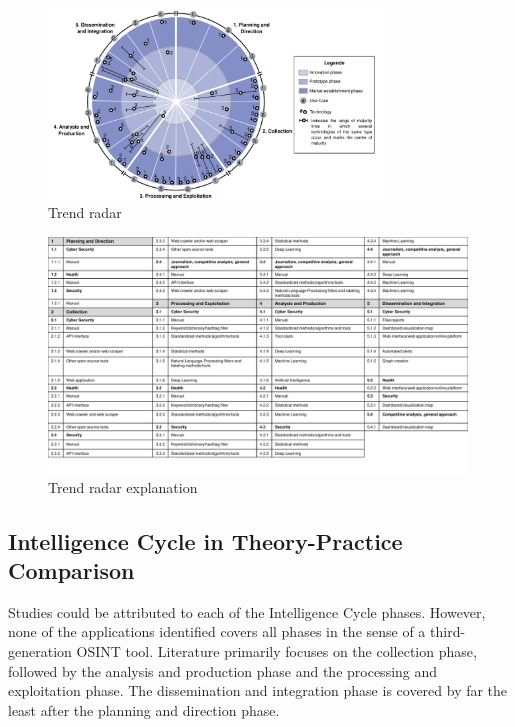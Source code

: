 \documentclass[10pt]{article}
\begin{document}
\begin{figure}[thb]
    \centering
    \includegraphics[width=0.8\textwidth]{PDF/images/crop_Trendradar}
    \caption{Trend radar}
    \label{fig:trendradar}
\end{figure}

\begin{figure}[thb]
    \centering
    \includegraphics[width=0.99\textwidth]{PDF/images/crop_Trendradar explanation}
    \caption{Trend radar explanation}
    \label{fig:trendradarexplanation}
\end{figure}

\subsection{Intelligence Cycle in Theory-Practice Comparison}

Studies could be attributed to each of the Intelligence Cycle phases. However,
none of the applications identified covers all phases in the sense of a third-generation
OSINT tool. Literature primarily focuses on the collection phase, followed by
the analysis and production phase and the processing and exploitation phase.
The dissemination and integration phase is covered by far the least after the planning
and direction phase.
\end{document}
